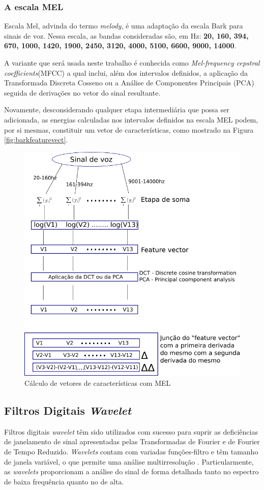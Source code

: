 	\subsubsection{A escala MEL}
		\par Escala Mel, advinda do termo \textit{melody},  é uma adaptação da escala Bark para sinais de voz.  Nessa escala, as bandas consideradas são, em Hz: \textbf{20, 160, 394, 670, 1000, 1420, 1900, 2450, 3120, 4000, 5100, 6600, 9000, 14000}.
		\par A variante que será usada neste trabalho é conhecida como \textit{Mel-frequency cepstral coefficients}(MFCC) a qual inclui, além dos intervalos definidos, a aplicação da Transformada Discreta Cosseno \cite{XXXXXX} ou a Análise de Componentes Principais (PCA) \cite{XXXXXX} seguida de derivações no vetor do sinal resultante.
		\par Novamente, desconsiderando qualquer etapa intermediária que possa ser adicionada, as energias calculadas nos intervalos definidos na escala MEL podem, por si mesmas, constituir um vetor de características, como mostrado na Figura \ref{fig:barkfeaturevect}.
		\begin{figure}[h]
			\centering
			\includegraphics[width=0.8\linewidth]{images/melFeatureVect}
			\caption{Cálculo de vetores de características com MEL}
			\label{fig:melfeaturevect}
		\end{figure}
	
			\subsection{Filtros Digitais \textit{Wavelet}}
			\par Filtros digitais \textit{wavelet} têm sido utilizados com sucesso para suprir as deficiências de janelamento de sinal apresentadas pelas Transformadas de Fourier e de Fourier de Tempo Reduzido. \textit{Wavelets} contam com variadas funções-filtro e têm tamanho de janela variável, o que permite uma análise multirresolução \cite{Rod5254905}. Particularmente, as \textit{wavelets} proporcionam a análise do sinal de forma detalhada tanto no espectro de baixa frequência quanto no de alta.
			
